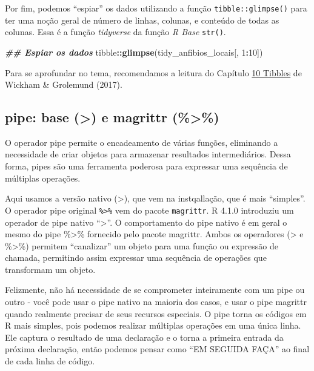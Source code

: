 \documentclass[
]{article}
\newenvironment{Shaded}{\begin{snugshade}}{\end{snugshade}}
\newcommand{\DecValTok}[1]{\textcolor[rgb]{0.00,0.00,0.81}{#1}}
\newcommand{\DocumentationTok}[1]{\textcolor[rgb]{0.56,0.35,0.01}{\textbf{\textit{#1}}}}
\newcommand{\FunctionTok}[1]{\textcolor[rgb]{0.13,0.29,0.53}{\textbf{#1}}}
\newcommand{\NormalTok}[1]{#1}
\newcommand{\SpecialCharTok}[1]{\textcolor[rgb]{0.81,0.36,0.00}{\textbf{#1}}}
\begin{document}
\begin{Shaded}
\end{Shaded}

Por fim, podemos ``espiar'' os dados utilizando a função \texttt{tibble::glimpse()} para ter uma noção geral de número de linhas, colunas, e conteúdo de todas as colunas. Essa é a função \emph{tidyverse} da função \emph{R Base} \texttt{str()}.

\begin{Shaded}
\begin{Highlighting}[]
\DocumentationTok{\#\# Espiar os dados}
\NormalTok{tibble}\SpecialCharTok{::}\FunctionTok{glimpse}\NormalTok{(tidy\_anfibios\_locais[, }\DecValTok{1}\SpecialCharTok{:}\DecValTok{10}\NormalTok{])}
\end{Highlighting}
\end{Shaded}

Para se aprofundar no tema, recomendamos a leitura do Capítulo \href{https://r4ds.had.co.nz/tibbles.html}{10 Tibbles} de Wickham \& Grolemund (2017).

\hypertarget{pipe-base-e-magrittr}{%
\subsection{pipe: base (\textbar\textgreater) e magrittr (\%\textgreater\%)}\label{pipe-base-e-magrittr}}

O operador pipe permite o encadeamento de várias funções, eliminando a necessidade de criar objetos para armazenar resultados intermediários. Dessa forma, pipes são uma ferramenta poderosa para expressar uma sequência de múltiplas operações.

Aqui usamos a versão nativo (\textbar\textgreater), que vem na instqallação, que é mais ``simples''. O operador pipe original \texttt{\%\textgreater{}\%} vem do pacote \texttt{magrittr}. R 4.1.0 introduziu um operador de pipe nativo ``\textbar\textgreater{}''. O comportamento do pipe nativo é em geral o mesmo do pipe \%\textgreater\% fornecido pelo pacote magrittr. Ambos os operadores (\textbar\textgreater{} e \%\textgreater\%) permitem ``canalizar'' um objeto para uma função ou expressão de chamada, permitindo assim expressar uma sequência de operações que transformam um objeto.

Felizmente, não há necessidade de se comprometer inteiramente com um pipe ou outro - você pode usar o pipe nativo na maioria dos casos, e usar o pipe magrittr quando realmente precisar de seus recursos especiais. O pipe torna os códigos em R mais simples, pois podemos realizar múltiplas operações em uma única linha. Ele captura o resultado de uma declaração e o torna a primeira entrada da próxima declaração, então podemos pensar como ``EM SEGUIDA FAÇA'' ao final de cada linha de código.
\end{document}
